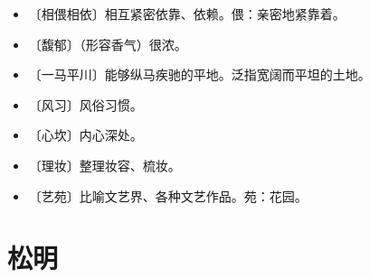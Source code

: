 \documentclass[12pt,UTF-8,openany]{ctexbook}
\begin{document}
\begin{itemize}
    \setlength\itemsep{-0.2em}
    \item 〔相偎相依〕相互紧密依靠、依赖。偎：亲密地紧靠着。
    \item 〔馥郁〕（形容香气）很浓。
    \item 〔一马平川〕能够纵马疾驰的平地。泛指宽阔而平坦的土地。
    \item 〔风习〕风俗习惯。
    \item 〔心坎〕内心深处。
    \item 〔理妆〕整理妆容、梳妆。
    \item 〔艺苑〕比喻文艺界、各种文艺作品。苑：花园。
\end{itemize}

\chapter{松明}
\end{document}

